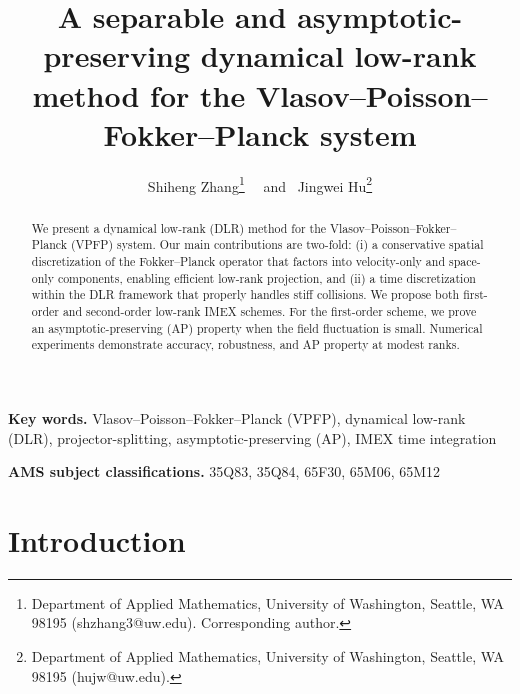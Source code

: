 \documentclass[]{article}
\title{A separable and asymptotic-preserving dynamical low-rank method for the Vlasov--Poisson--Fokker--Planck system}
\date{}
\author{Shiheng Zhang\footnote{Department of Applied Mathematics, University of Washington, Seattle, WA 98195 (shzhang3@uw.edu). Corresponding author.} \
	\ and \  Jingwei Hu\footnote{Department of Applied Mathematics, University of Washington, Seattle, WA 98195 (hujw@uw.edu).} }
\numberwithin{equation}{section}
\begin{document}
\maketitle

\begin{abstract}
We present a dynamical low-rank (DLR) method for the Vlasov--Poisson--Fokker--Planck (VPFP) system. Our main contributions are two-fold: (i) a conservative spatial discretization of the 
Fokker--Planck operator that factors into velocity-only and space-only components, enabling efficient low-rank projection, and (ii) a time discretization within the DLR framework that properly handles stiff collisions. We propose both first-order and second-order low-rank IMEX schemes. For the first-order scheme, we prove an asymptotic-preserving (AP) property when the field fluctuation is small. Numerical experiments demonstrate accuracy, robustness, and AP property at modest ranks.
\end{abstract}

{\small 
{\bf Key words.} Vlasov--Poisson--Fokker--Planck (VPFP), dynamical low-rank (DLR), projector-splitting, asymptotic-preserving (AP), IMEX time integration

{\bf AMS subject classifications.} 35Q83, 35Q84, 65F30, 65M06, 65M12
}

\section{Introduction}
\label{sec:intro}
\end{document}
